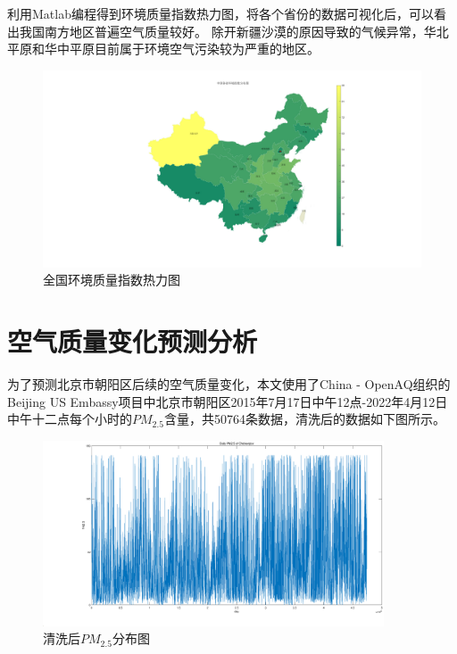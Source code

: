 \documentclass[UTF8]{ctexart}
\begin{document}
\newpage
利用Matlab编程得到环境质量指数热力图，将各个省份的数据可视化后，可以看出我国南方地区普遍空气质量较好。
除开新疆沙漠的原因导致的气候异常，华北平原和华中平原目前属于环境空气污染较为严重的地区。

\begin{figure}[H] %
    \includegraphics[width=1\textwidth]{./picture/ChinaMap.pdf} %
    \caption{全国环境质量指数热力图} 
\end{figure}

\newpage
\section{空气质量变化预测分析}
为了预测北京市朝阳区后续的空气质量变化，本文使用了China - OpenAQ组织的Beijing US Embassy项目中北京市朝阳区2015年7月17日中午12点-2022年4月12日中午十二点每个小时的$PM_{2.5}$含量，共50764条数据，清洗后的数据如下图所示。
\begin{figure}[H] %
    \centering %
    \includegraphics[width=0.9\textwidth]{./picture/DailyPM2.5ofhickenpoxeps.eps} %
    \caption{清洗后$PM_{2.5}$分布图} 
\end{figure}
\end{document}
